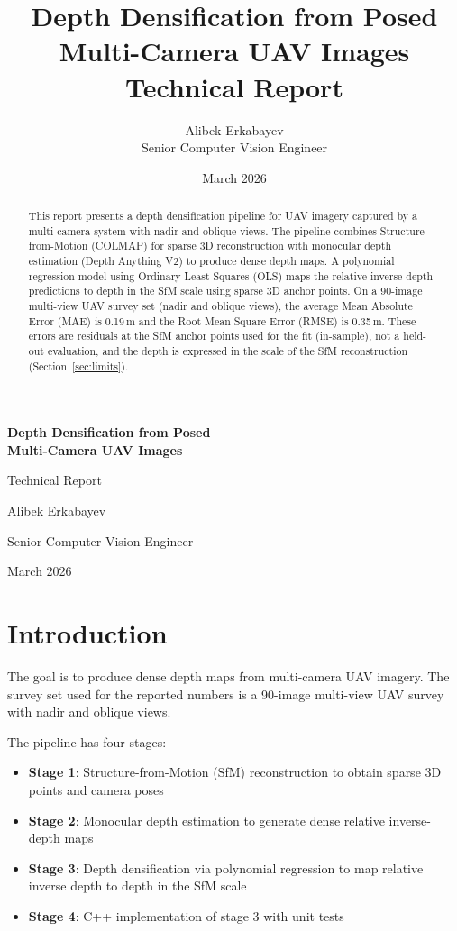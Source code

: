 \documentclass[11pt,a4paper]{article}
\title{
    \vspace{-1cm}
    \textbf{Depth Densification from Posed Multi-Camera UAV Images}\\
    \large Technical Report
}
\author{Alibek Erkabayev\\Senior Computer Vision Engineer}
\date{March 2026}
\begin{document}
\begin{titlepage}
\centering
\vspace*{3cm}
{\LARGE\bfseries Depth Densification from Posed\\Multi-Camera UAV Images\par}
\vspace{0.5cm}
{\large Technical Report\par}
\vspace{2cm}
{\Large Alibek Erkabayev\par}
\vspace{0.3cm}
{\large Senior Computer Vision Engineer\par}
\vspace{3cm}
{\large March 2026\par}
\vfill
\end{titlepage}

\begin{abstract}
\noindent
This report presents a depth densification pipeline for UAV imagery captured by a multi-camera system with nadir and oblique views. The pipeline combines Structure-from-Motion (COLMAP) for sparse 3D reconstruction with monocular depth estimation (Depth Anything V2) to produce dense depth maps. A polynomial regression model using Ordinary Least Squares (OLS) maps the relative inverse-depth predictions to depth in the SfM scale using sparse 3D anchor points. On a 90-image multi-view UAV survey set (nadir and oblique views), the average Mean Absolute Error (MAE) is 0.19\,m and the Root Mean Square Error (RMSE) is 0.35\,m. These errors are residuals at the SfM anchor points used for the fit (in-sample), not a held-out evaluation, and the depth is expressed in the scale of the SfM reconstruction (Section~\ref{sec:limits}).
\end{abstract}

\section{Introduction}

The goal is to produce dense depth maps from multi-camera UAV imagery. The survey set used for the reported numbers is a 90-image multi-view UAV survey with nadir and oblique views.

The pipeline has four stages:
\begin{itemize}[noitemsep]
    \item \textbf{Stage 1}: Structure-from-Motion (SfM) reconstruction to obtain sparse 3D points and camera poses
    \item \textbf{Stage 2}: Monocular depth estimation to generate dense relative inverse-depth maps
    \item \textbf{Stage 3}: Depth densification via polynomial regression to map relative inverse depth to depth in the SfM scale
    \item \textbf{Stage 4}: C++ implementation of stage 3 with unit tests
\end{itemize}
\end{document}
